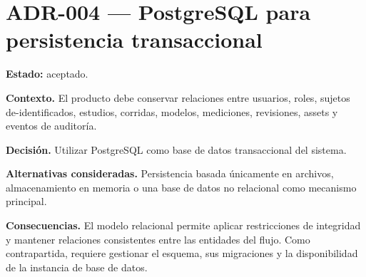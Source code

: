 \section*{ADR-004 --- PostgreSQL para persistencia transaccional}
\label{adr:004-postgresql-persistencia}

\textbf{Estado:} aceptado.

\textbf{Contexto.} El producto debe conservar relaciones entre usuarios, roles, sujetos de-identificados, estudios, corridas, modelos, mediciones, revisiones, assets y eventos de auditoría.

\textbf{Decisión.} Utilizar PostgreSQL como base de datos transaccional del sistema.

\textbf{Alternativas consideradas.} Persistencia basada únicamente en archivos, almacenamiento en memoria o una base de datos no relacional como mecanismo principal.

\textbf{Consecuencias.} El modelo relacional permite aplicar restricciones de integridad y mantener relaciones consistentes entre las entidades del flujo. Como contrapartida, requiere gestionar el esquema, sus migraciones y la disponibilidad de la instancia de base de datos.


